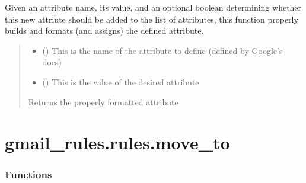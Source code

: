 \documentclass[letterpaper,10pt,english]{sphinxmanual}
\begin{document}
\begin{fulllineitems}
\begin{fulllineitems}
\label{\detokenize{_autosummary/gmail_rules.rules.copy_to:gmail_rules.rules.copy_to.Copy_To.xml_format_rule_attribute}}
\pysigstartsignatures
{}
\pysigstopsignatures
\sphinxAtStartPar
Given an attribute name, its value, and an optional boolean determining whether this
new attriute should be added to the list of attributes, this function properly builds
and formats (and assigns) the defined attribute.
\begin{quote}\begin{description}
\begin{itemize}
\item {} 
\sphinxAtStartPar
{} () \textendash{} This is the name of the attribute to define (defined by Google’s docs)

\item {} 
\sphinxAtStartPar
{} () \textendash{} This is the value of the desired attribute

\end{itemize}

\sphinxAtStartPar
{} \textendash{} Returns the properly formatted attribute

\sphinxAtStartPar
{}

\end{description}\end{quote}

\end{fulllineitems}


\end{fulllineitems}


\sphinxstepscope


\section{gmail\_rules.rules.move\_to}
\label{\detokenize{_autosummary/gmail_rules.rules.move_to:module-gmail_rules.rules.move_to}}\label{\detokenize{_autosummary/gmail_rules.rules.move_to:gmail-rules-rules-move-to}}\label{\detokenize{_autosummary/gmail_rules.rules.move_to::doc}}\subsubsection*{Functions}
\end{document}
